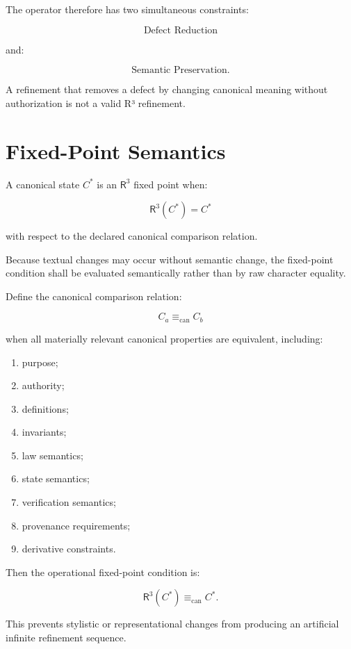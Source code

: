 \documentclass[11pt]{article}
\newcommand{\Rthree}{\ensuremath{\mathsf{R}^{3}}}
\begin{document}
The operator therefore has two simultaneous constraints:

\[
\boxed{
\text{Defect Reduction}
}
\]

and:

\[
\boxed{
\text{Semantic Preservation}.
}
\]

A refinement that removes a defect by changing canonical meaning
without authorization is not a valid R³ refinement.

\section{Fixed-Point Semantics}

A canonical state $C^{*}$ is an \Rthree{} fixed point when:

\[
\boxed{
\Rthree(C^{*})=C^{*}
}
\]

with respect to the declared canonical comparison relation.

Because textual changes may occur without semantic change, the
fixed-point condition shall be evaluated semantically rather than
by raw character equality.

Define the canonical comparison relation:

\[
C_a\equiv_{\mathrm{can}} C_b
\]

when all materially relevant canonical properties are equivalent,
including:

\begin{enumerate}
    \item purpose;
    \item authority;
    \item definitions;
    \item invariants;
    \item law semantics;
    \item state semantics;
    \item verification semantics;
    \item provenance requirements;
    \item derivative constraints.
\end{enumerate}

Then the operational fixed-point condition is:

\[
\boxed{
\Rthree(C^{*})
\equiv_{\mathrm{can}}
C^{*}.
}
\]

This prevents stylistic or representational changes from
producing an artificial infinite refinement sequence.
\end{document}
